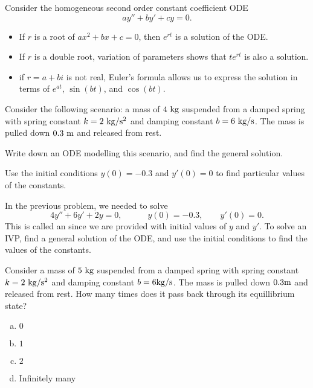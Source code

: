 
\begin{applicationActivities}

\begin{observation}
Consider the homogeneous second order constant coefficient ODE \[ay''+by'+cy=0.\]
\vfill
\begin{itemize}
\item If \(r\) is a root of \(ax^2+bx+c=0\), then \(e^{rt}\) is a solution of the ODE.
\item If \(r\) is a double root, variation of parameters shows that \(te^{rt}\) is also a solution.
\item if \(r=a+bi\) is not real, Euler's formula allows us to express the solution in terms of \(e^{at}\), \(\sin(bt)\), and \(\cos(bt)\).
\end{itemize}
\end{observation}

\begin{activity}{15}
Consider the following scenario:  a mass of \(4\ {\rm kg}\) suspended from a damped spring with spring constant \(k=2\ {\rm kg/s^2}\) and damping constant \(b= 6\ {\rm kg/s}\).  
\vfill
The mass is pulled down \(0.3\ {\rm m}\) and released from rest.  
\begin{subactivity}
Write down an ODE modelling this scenario, and find the general solution.
\end{subactivity}
\begin{subactivity}
Use the initial conditions \(y(0)=-0.3\) and \(y'(0)=0\) to find particular values of the constants.
\end{subactivity}
\end{activity}

\begin{definition}
In the previous problem, we needed to solve
\[ 4y''+6y'+2y = 0, \hspace{3em} y(0)=-0.3, \hspace{2em} y'(0)=0 .\]
This is called an  since we are provided with initial values of \(y\) and \(y'\).
\vfill
To solve an IVP, find a general solution of the ODE, and use the initial conditions to find the values of the constants.
\end{definition}

\begin{activity}{15}
Consider a mass of \(5\ {\rm kg}\) suspended from a damped spring with spring constant \(k=2\ {\rm kg/s^2}\) and damping constant \(b= 6{\rm kg/s}\).  
\vfill
The mass is pulled down \(0.3 {\rm m}\) and released from rest.  How many times does it pass back through its equillibrium state?
\vfill
\begin{enumerate}[(a)]
\item \(0\)
\item \(1\)
\item \(2\)
\item Infinitely many
\end{enumerate}
\end{activity}


\end{applicationActivities}
